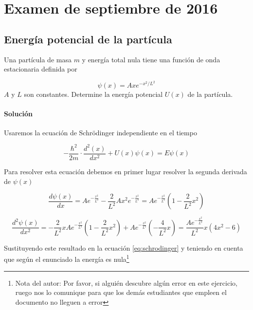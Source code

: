 \documentclass[12pt, a4paper]{article}
\begin{document}
    \section{Examen de septiembre de 2016}
    \setcounter{subsection}{0}
    \subsection{Energía potencial de la partícula}
    Una partícula de masa $m$ y energía total nula tiene una función de onda estacionaria
    definida por

    $$\psi(x)=Axe^{-x^2/L^2}$$
    $A$ y $L$ son constantes. Determine la energía potencial $U(x)$ de la partícula.

    \paragraph{\textbf{Solución}}

    \paragraph{} Usaremos la ecuación de Schrödinger independiente en el tiempo

    \begin{equation}    \label{eq:schrodinger}
        -\frac{\hbar^2}{2m}\cdot\frac{d^2(x)}{dx^2}+U(x)\psi(x)=E\psi(x)
    \end{equation}


    Para resolver esta ecuación debemos en primer lugar resolver la segunda derivada de $\psi(x)$

    $$\frac{d\psi(x)}{dx} = A e^{-\frac{x^2}{L^2}}-\frac{2}{L^2} A x^2 e^{-\frac{x^2}{L^2}} = A e^{-\frac{x^2}{L^2}}\left(1-\frac{2}{L^2}x^2\right)$$

    $$\frac{d^2\psi(x)}{dx^2} = -\frac{2}{L^2}xAe^{-\frac{x^2}{L^2}}\left(1-\frac{2}{L^2}x^2\right)+A e^{-\frac{x^2}{L^2}}\left(-\frac{4}{L^2}x\right) =
        \frac{Ae^{-\frac{x^2}{L^2}}}{L^2}x(4x^2-6)$$

    Sustituyendo este resultado en la ecuación \ref{eq:schrodinger} y teniendo en cuenta que según el enunciado la energía es nula\footnote{Nota
    del autor: Por favor, si alguién descubre algún error en este ejercicio, ruego nos lo comunique para que los demás estudiantes
    que empleen el documento no lleguen a error}
\end{document}
